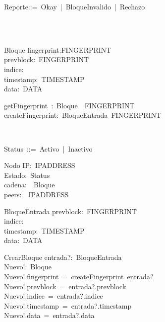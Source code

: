 \begin{zed}
Reporte::=~Okay~|~BloqueInvalido~|~Rechazo~\\
\\
\end{zed}
\begin{zed}
\\
\end{zed}
\begin{schema}{Bloque}
fingerprint:FINGERPRINT\\
prevblock:~FINGERPRINT\\
indice:~\nat\\
timestamp:~TIMESTAMP\\
data:~DATA\\
\end{schema}
\begin{axdef}
getFingerprint~:~Bloque~\fun~FINGERPRINT\\
createFingerprint:~BloqueEntrada\fun~FINGERPRINT\\
\end{axdef}
\begin{zed}
[IPADDRESS]\\
\end{zed}
\begin{zed}
Status~::=~Activo~|~Inactivo\\
\end{zed}
\begin{schema}{Nodo}
IP:~IPADDRESS\\
Estado:~Status\\
cadena:~\seq~Bloque\\
peers:~\power~IPADDRESS\\
\end{schema}
\begin{schema}{BloqueEntrada}
prevblock:~FINGERPRINT~\\
indice:~\nat\\
timestamp:~TIMESTAMP\\
data:~DATA\\
\end{schema}
\begin{schema}{CrearBloque}
entrada?:~BloqueEntrada\\
Nuevo!:~Bloque\\
\where
Nuevo!.fingerprint~=~createFingerprint~entrada?\\
Nuevo!.prevblock~=~entrada?.prevblock\\
Nuevo!.indice~=~entrada?.indice\\
Nuevo!.timestamp~=~entrada?.timestamp\\
Nuevo!.data~=~entrada?.data\\
\end{schema}
